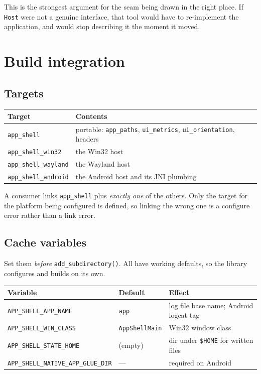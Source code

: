 \documentclass[11pt,a4paper]{article}
\begin{document}
This is the strongest argument for the seam being drawn in the right place. If
\texttt{Host} were not a genuine interface, that tool would have to
re-implement the application, and would stop describing it the moment it moved.

\section{Build integration}

\subsection{Targets}

\begin{center}
\begin{tabular}{@{}ll@{}}
\toprule
Target & Contents \\
\midrule
\texttt{app\_shell}         & portable: \texttt{app\_paths}, \texttt{ui\_metrics}, \texttt{ui\_orientation}, headers \\
\texttt{app\_shell\_win32}   & the Win32 host \\
\texttt{app\_shell\_wayland} & the Wayland host \\
\texttt{app\_shell\_android} & the Android host and its JNI plumbing \\
\bottomrule
\end{tabular}
\end{center}

A consumer links \texttt{app\_shell} plus \emph{exactly one} of the others. Only
the target for the platform being configured is defined, so linking the wrong
one is a configure error rather than a link error.

\subsection{Cache variables}

Set them \emph{before} \texttt{add\_subdirectory()}. All have working defaults,
so the library configures and builds on its own.

\begin{center}
\begin{tabular}{@{}lll@{}}
\toprule
Variable & Default & Effect \\
\midrule
\texttt{APP\_SHELL\_APP\_NAME}   & \texttt{app}          & log file base name; Android logcat tag \\
\texttt{APP\_SHELL\_WIN\_CLASS}  & \texttt{AppShellMain} & Win32 window class \\
\texttt{APP\_SHELL\_STATE\_HOME} & (empty)               & dir under \texttt{\$HOME} for written files \\
\texttt{APP\_SHELL\_NATIVE\_APP\_GLUE\_DIR} & --- & required on Android \\
\bottomrule
\end{tabular}
\end{center}
\end{document}
